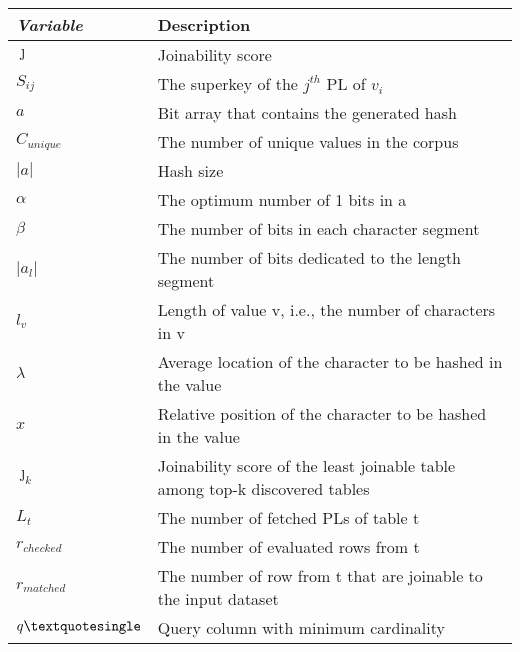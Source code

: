 




\begin{table}[]
    \scriptsize
    \centering
    \caption{}
    \label{tab:variables}
\begin{tabular}{l|l}
\toprule
\textit{\textbf{Variable}} &
\textbf{Description} \\ \toprule
$\jmath$ & Joinability score  \\
$S_{ij}$ & The superkey of the $j^{th}$ PL of $v_i$\\
$a$ & Bit array that contains the generated hash\\
$C_{unique}$ & The number of unique values in the corpus\\
$|a|$ & Hash size\\
$\alpha$ & The optimum number of 1 bits in a\\
$\beta$ & The number of bits in each character segment\\
$|a_l|$ & The number of bits dedicated to the length segment\\
$l_v$& Length of value v, i.e., the number of characters in v\\
$\lambda$&Average location of the character to be hashed in the value\\
$x$& Relative position of the character to be hashed in the value\\
$\jmath_k$&Joinability score of the least joinable table among top-k discovered tables\\
$L_t$& The number of fetched PLs of table t\\
$r_{checked}$&The number of evaluated rows from t\\
$r_{matched}$&The number of row from t that are joinable to the input dataset\\
$q\textquotesingle$ & Query column with minimum cardinality\\
\toprule
\end{tabular}
\end{table}
